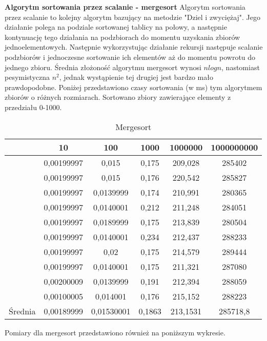 \documentclass[10pt, a4paper]{article}
\begin{document}
\begin{flushleft}
\newpage
\textbf{Algorytm sortowania przez scalanie - mergesort} \newline \newline
Algorytm sortowania przez scalanie to kolejny algorytm bazujący na metodzie "Dziel i zwyciężaj". Jego działanie polega na podziale sortowanej tablicy na połowy, a następnie kontynuację tego działania na podzbiorach do momentu uzyskania zbiorów jednoelementowych. Następnie wykorzystując działanie rekursji następuje scalanie podzbiorów i jednoczesne sortowanie ich elementów aż do momentu powrotu do jednego zbioru. Średnia złożoność algorytmu mergesort wynosi $nlogn$, nastomiast pesymistyczna $n^2$, jednak wystąpienie tej drugiej jest bardzo mało prawdopodobne. Poniżej przedstawiono czasy sortowania (w ms) tym algorytmem zbiorów o różnych rozmiarach. Sortowano zbiory zawierające elementy z przedziału 0-1000. \newline \newline

\begin{table}[h]
\centering
\caption{Mergesort}
\begin{tabular}{|c|c|c|c|c|c|} \hline
& 10 & 100 & 1000 & 1000000 & 1000000000 \\ \hline
& 0,00199997 & 0,015 & 0,175 & 209,028 & 285402 \\
& 0,00199997 & 0,015 & 0,176 & 220,542 & 285827 \\
& 0,00199997 & 0,0139999 & 0,174 & 210,991 & 280365 \\
& 0,00199997 & 0,0140001 & 0,212 & 211,248 & 284051 \\
& 0,00199997 & 0,0189999 & 0,175 & 213,839 & 280504 \\
& 0,00199997 & 0,0140001 & 0,234 & 212,437 & 288233 \\
& 0,00199997 & 0,02 & 0,175 & 214,579 & 289444 \\
& 0,00199997 & 0,0140001 & 0,175 & 211,321 & 287080 \\
& 0,00200009 & 0,0139999 & 0,191 & 212,394 & 288059 \\
& 0,00100005 & 0,014001 & 0,176 & 215,152 & 288223 \\ \hline
Średnia & 0,00189999 & 0,01530001 & 0,1863 & 213,1531 & 285718,8 \\ \hline
\end{tabular}
\end{table}

Pomiary dla mergesort przedstawiono również na poniższym wykresie. \newline


\end{flushleft}
\end{document}
